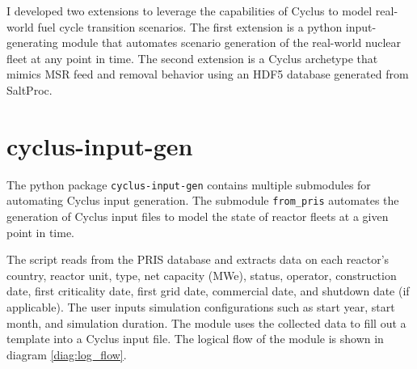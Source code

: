 I developed two extensions to leverage 
the capabilities of Cyclus to model
real-world fuel cycle transition scenarios.
The first extension is a python input-generating module
that automates scenario generation of the real-world 
nuclear fleet at any point in time. The second extension
is a Cyclus archetype that mimics \gls{MSR} feed and removal
behavior using an HDF5 database generated from SaltProc.

\section{cyclus-input-gen}
\label{sec:writeinput}
The python package \texttt{cyclus-input-gen} contains
multiple submodules for automating Cyclus input generation.
The submodule \texttt{from\_pris} automates the generation of Cyclus input files
to model the state of reactor fleets at a given
point in time.

The script reads from the \gls{PRIS} database \cite{iaea_nuclear_2018}
and extracts data on each reactor's country, reactor unit,
type, net capacity (MWe), status, operator, construction date,
first criticality date, first grid date, commercial date,
and shutdown date (if applicable). The user inputs simulation
configurations such as start year, start month, and
simulation duration. The module uses the collected data to
fill out a template into a Cyclus input file. The logical flow of the module is 
shown in diagram \ref{diag:log_flow}.


